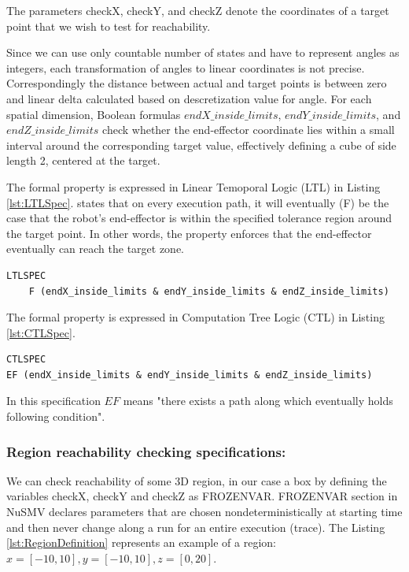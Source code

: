 The parameters checkX, checkY, and checkZ 
denote the coordinates of a target point that we wish to test for reachability. 

Since we can use only countable number of states and have to represent angles as  integers,
each transformation of angles to linear coordinates is not precise. 
Correspondingly the distance between actual and target points is between zero and linear 
delta calculated based on descretization value for angle.
For each spatial dimension, Boolean formulas $endX\_inside\_limits$, $endY\_inside\_limits$, 
and $endZ\_inside\_limits$ check whether the end-effector coordinate lies within a 
small interval around the corresponding target value, effectively 
defining a cube of side length 2, centered at the target.

The formal property is expressed in Linear Temoporal Logic (LTL) in Listing \ref{lst:LTLSpec}.
states that on every execution path, it will eventually (F) be 
the case that the robot’s end-effector is  within the specified tolerance region around 
the target point. In other words, the property enforces that the end-effector  
eventually can reach the target zone.

\begin{lstlisting}[language=NuSMV, caption={Reachability condition in LTL specification}, 
    label={lst:LTLSpec}]
    LTLSPEC 
    F (endX_inside_limits & endY_inside_limits & endZ_inside_limits)
\end{lstlisting}
The formal property is expressed in Computation Tree Logic (CTL) in Listing \ref{lst:CTLSpec}.

\begin{lstlisting}[language=NuSMV, caption={Reachability condition in CTL specification}, 
    label={lst:CTLSpec}]
CTLSPEC 
EF (endX_inside_limits & endY_inside_limits & endZ_inside_limits)
\end{lstlisting}

In this specification $EF$ means "there exists a path along 
which eventually holds following condition". 


\subsubsection{Region reachability checking specifications:}

We can check reachability of some 3D region, in our case a box by defining the 
variables checkX, checkY and checkZ as FROZENVAR. 
FROZENVAR section in NuSMV declares parameters that are chosen 
nondeterministically at starting time 
and then never change along a run for an entire execution (trace).
The Listing \ref{lst:RegionDefinition}  represents an example 
of a region: \\ $x=[-10,10],y=[-10,10],z=[0,20]$.

